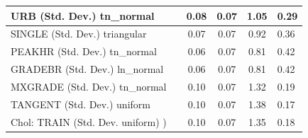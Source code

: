 \begin{table}
\begin{center}
\begin{tabular}{|l|l|c|c|c|l|}
			URB (Std. Dev.) tn_normal &  & 0.08 & 0.07 & 1.05 & 0.29 \\
			\hline
			SINGLE (Std. Dev.) triangular &  & 0.07 & 0.07 & 0.92 & 0.36 \\
			\hline
			PEAKHR (Std. Dev.) tn_normal &  & 0.06 & 0.07 & 0.81 & 0.42 \\
			\hline
			GRADEBR (Std. Dev.) ln_normal &  & 0.06 & 0.07 & 0.81 & 0.42 \\
			\hline
			MXGRADE (Std. Dev.) tn_normal &  & 0.10 & 0.07 & 1.32 & 0.19 \\
			\hline
			TANGENT (Std. Dev.) uniform &  & 0.10 & 0.07 & 1.38 & 0.17 \\
			\hline
			 Chol: TRAIN (Std. Dev. uniform) ) &  & 0.10 & 0.07 & 1.35 & 0.18 \\
			\hline
		\end{tabular}
	\end{center}
\end{table}